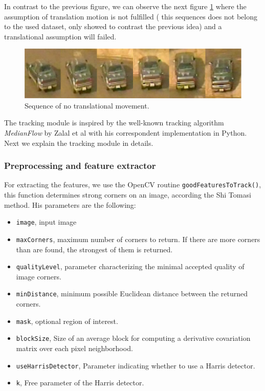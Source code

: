 \documentclass[12pt, a4paper, titlepage,twoside,openright]{article}
\begin{document}
In contrast to the previous figure, we can observe the next figure \ref{track2w} where the assumption of translation motion is not fulfilled ( this sequences does not belong to the used dataset, only showed to contrast the previous idea) and a translational assumption will failed.

\begin{figure}[H]
\centering         
\includegraphics[width=0.9\linewidth]{changeCamera/out2.png}
\caption{Sequence of no translational movement.} \label{track2w}
\end{figure}




The tracking module is inspired by the well-known tracking algorithm \textit{MedianFlow} by Zalal et al\cite{medianFlow} with his correspondent implementation in Python\cite{medianFlowPython}. Next we explain the tracking module in details.


\subsubsection{Preprocessing and feature extractor}


For extracting the features, we use the OpenCV routine \texttt{goodFeaturesToTrack()}, this function determines strong corners on an image, according the Shi Tomasi method. His parameters are the following:
 
\begin{itemize}

\item \texttt{image}, input image

\item \texttt{maxCorners}, maximum number of corners to return. If there are more corners than are found, the strongest of them is returned.
\item \texttt{qualityLevel}, parameter characterizing the minimal accepted quality of image corners.
\item \texttt{minDistance}, minimum possible Euclidean distance between the returned corners.
\item \texttt{mask}, optional region of interest.
\item \texttt{blockSize}, Size of an average block for computing a derivative covariation matrix over each pixel neighborhood.
\item \texttt{useHarrisDetector},  Parameter indicating whether to use a Harris detector.
\item \texttt{k},  Free parameter of the Harris detector.

\end{itemize}
 
\end{document}
